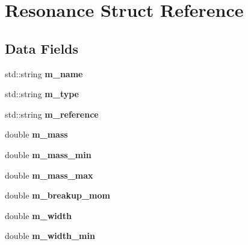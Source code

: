 \hypertarget{struct_resonance}{\section{Resonance Struct Reference}
\label{struct_resonance}
}
\subsection*{Data Fields}
\begin{DoxyCompactItemize}
\item 
\hypertarget{struct_resonance_a1f8a5834b734d5666dddd144ec8398bc}{std\-::string {\bfseries m\-\_\-name}}\label{struct_resonance_a1f8a5834b734d5666dddd144ec8398bc}

\item 
\hypertarget{struct_resonance_a8990beafbe0fcae02add43d56fbf76c2}{std\-::string {\bfseries m\-\_\-type}}\label{struct_resonance_a8990beafbe0fcae02add43d56fbf76c2}

\item 
\hypertarget{struct_resonance_acbe03f1359a0eb1bf721fea9a7a03b13}{std\-::string {\bfseries m\-\_\-reference}}\label{struct_resonance_acbe03f1359a0eb1bf721fea9a7a03b13}

\item 
\hypertarget{struct_resonance_ab9de5ccd6d828375f6619356f188bdbf}{double {\bfseries m\-\_\-mass}}\label{struct_resonance_ab9de5ccd6d828375f6619356f188bdbf}

\item 
\hypertarget{struct_resonance_ae58216b62a7b73ee275c228dc168d8e6}{double {\bfseries m\-\_\-mass\-\_\-min}}\label{struct_resonance_ae58216b62a7b73ee275c228dc168d8e6}

\item 
\hypertarget{struct_resonance_a10b762dd6be3a75ef2dbc7db8ce0df82}{double {\bfseries m\-\_\-mass\-\_\-max}}\label{struct_resonance_a10b762dd6be3a75ef2dbc7db8ce0df82}

\item 
\hypertarget{struct_resonance_ac429a425cd63073c04f3ed783df31a46}{double {\bfseries m\-\_\-breakup\-\_\-mom}}\label{struct_resonance_ac429a425cd63073c04f3ed783df31a46}

\item 
\hypertarget{struct_resonance_a6a164223523da9b82f05dfe412bf7d85}{double {\bfseries m\-\_\-width}}\label{struct_resonance_a6a164223523da9b82f05dfe412bf7d85}

\item 
\hypertarget{struct_resonance_a96cd124336b15b78a2da80667f754c16}{double {\bfseries m\-\_\-width\-\_\-min}}\label{struct_resonance_a96cd124336b15b78a2da80667f754c16}


\end{DoxyCompactItemize}

